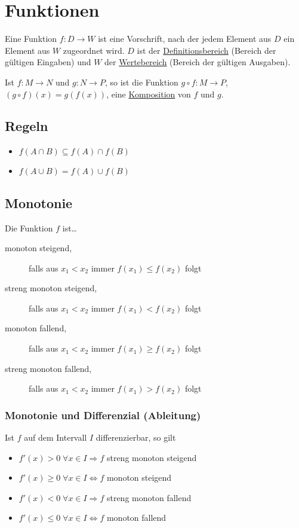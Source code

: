 \section{Funktionen}
Eine Funktion $f: D \rightarrow W$ ist eine Vorschrift, nach der jedem Element aus
$D$ ein Element aus $W$ zugeordnet wird. $D$ ist der \underline{Definitionsbereich}
(Bereich der gültigen Eingaben) und $W$ der \underline{Wertebereich}
(Bereich der gültigen Ausgaben).

Ist $f: M \rightarrow N$ und $g: N \rightarrow P$, so ist die Funktion $g \circ f: M \rightarrow P$,
$(g \circ f)(x) = g(f(x))$, eine \underline{Komposition} von $f$ und $g$.

\subsection{Regeln}
\begin{itemize}
	\item $f(A \cap B) \subseteq f(A) \cap f(B)$
	\item $f(A \cup B) = f(A) \cup f(B)$
\end{itemize}

\subsection{Monotonie}
Die Funktion $f$ ist\ldots
\begin{description}
	\item[monoton steigend,] falls aus $x_1 < x_2$ immer $f(x_1) \leq f(x_2)$ folgt
	\item[streng monoton steigend,] falls aus $x_1 < x_2$ immer $f(x_1) < f(x_2)$ folgt
	\item[monoton fallend,] falls aus $x_1 < x_2$ immer $f(x_1) \geq f(x_2)$ folgt
	\item[streng monoton fallend,] falls aus $x_1 < x_2$ immer $f(x_1) > f(x_2)$ folgt
\end{description}

\subsubsection{Monotonie und Differenzial (Ableitung)}
Ist $f$ auf dem Intervall $I$ differenzierbar, so gilt
\begin{itemize}
	\item $f'(x) > 0 \; \forall x \in I \Rightarrow f$ streng monoton steigend
	\item $f'(x) \geq 0 \; \forall x \in I \Leftrightarrow f$ monoton steigend
	\item $f'(x) < 0 \; \forall x \in I \Rightarrow f$ streng monoton fallend
	\item $f'(x) \leq 0 \; \forall x \in I \Leftrightarrow f$ monoton fallend
\end{itemize}

